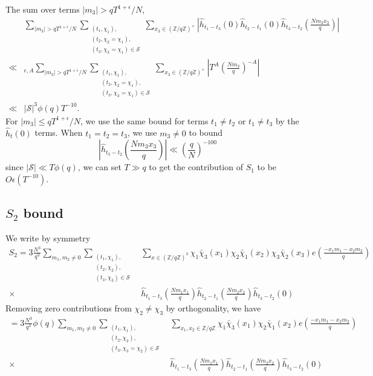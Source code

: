 The sum over terms $|m_3|>qT^{1+\epsilon}/N$,
\begin{align*}
   & \sum_{|m_3|>qT^{1+\epsilon}/N}\sum_{\substack{(t_1,\chi_1),\\(t_2,\chi_2=\chi_1),\\(t_3,\chi_3=\chi_1)\in\mathcal{S}}} \sum_{x_3\in (\mathbb{Z}/q\mathbb{Z})^{\times}}
   \left|\hat{h}_{t_1-t_3}\left(0\right)\hat{h}_{t_2-t_1}\left(0\right)\hat{h}_{t_3-t_2}\left(\frac{Nm_3x_3}{q}\right)\right|\\
    \ll&_{\epsilon,A}  \sum_{|m_3|>qT^{1+\epsilon}/N}\sum_{\substack{(t_1,\chi_1),\\(t_2,\chi_2=\chi_1),\\(t_3,\chi_3=\chi_1)\in\mathcal{S}}} \sum_{x_3\in (\mathbb{Z}/q\mathbb{Z})^{\times}}
    \left|T^{A}\left(\frac{Nm_3}{q} \right)^{-A}\right|\\
    \ll & |\mathcal{S}|^3\phi(q) T^{-10}.
\end{align*}
For $|m_3|\leq qT^{1+\epsilon}/N$, we use the same bound for terms $t_1\neq t_2$ or $t_1\neq t_3$ by the $\hat{h}_t(0)$ terms. When $t_1=t_2=t_3$, we use $m_3\neq 0$
to bound \[
    \left|\hat{h}_{t_3-t_2}\left(\frac{Nm_3x_3}{q}\right)\right| \ll \left(\frac{q}{N}\right)^{-100}
\]
since $|\mathcal{S}|\ll T\phi(q)$, we can set $T\gg q$ to get the contribution of $S_1$ to be $O\epsilon(T^{-10})$.
\subsection{$S_2$ bound}
We write by symmetry \begin{align*}
    S_2= 3\frac{N^3}{q^3}\sum_{m_1,m_2\neq 0}\sum_{\substack{(t_1,\chi_1),\\(t_2,\chi_2),\\(t_3,\chi_3)\in\mathcal{S}}} &\sum_{x\in (\mathbb{Z}/q\mathbb{Z})^3}\chi_1\bar{\chi}_3(x_1)\chi_2\bar{\chi}_1(x_2)\chi_3\bar{\chi}_2(x_3) e\left(\frac{-x_1m_1-x_2m_2}{q}\right)\\
    \times \ &\hat{h}_{t_1-t_3}\left(\frac{Nm_1x_1}{q}\right)\hat{h}_{t_2-t_1}\left(\frac{Nm_2x_2}{q}\right)\hat{h}_{t_3-t_2}\left(0\right)
\end{align*}
Removing zero contributions from $\chi_2\neq \chi_3$ by orthogonality,
we have \begin{align*}
    =3\frac{N^3}{q^3} \phi(q) \sum_{m_1,m_2\neq 0}\sum_{\substack{(t_1,\chi_1),\\(t_2,\chi_2),\\(t_3,\chi_3=\chi_2)\in\mathcal{S}}} &\sum_{x_1,x_2 \in \mathbb{Z}/q\mathbb{Z}}\chi_1\bar{\chi}_3(x_1)\chi_2\bar{\chi}_1(x_2) e\left(\frac{-x_1m_1-x_2m_2}{q}\right)\\
    \times \ &\hat{h}_{t_1-t_3}\left(\frac{Nm_1x_1}{q}\right)\hat{h}_{t_2-t_1}\left(\frac{Nm_2x_2}{q}\right)\hat{h}_{t_3-t_2}\left(0\right)
\end{align*}
